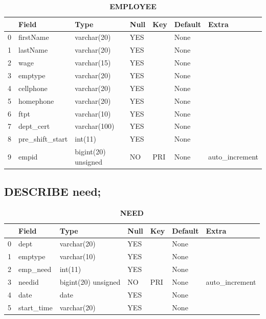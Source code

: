 \documentclass{article} %
\begin{document}
\begin{table}[H]
	\centering
	\caption{\textbf{EMPLOYEE}}
\begin{tabular}{|p{2cm}|p{2cm}|p{2cm}|p{2cm}|p{2cm}|p{2cm}|p{2cm}|}
	\hline
	\toprule
	{} &            Field &                 Type & Null &  Key & Default &           Extra \\
	\hline
	\midrule
	0 &        firstName &          varchar(20) &  YES &      &    None &                 \\
	1 &         lastName &          varchar(20) &  YES &      &    None &                 \\
	2 &             wage &          varchar(15) &  YES &      &    None &                 \\
	3 &          emptype &          varchar(20) &  YES &      &    None &                 \\
	4 &        cellphone &          varchar(20) &  YES &      &    None &                 \\
	5 &        homephone &          varchar(20) &  YES &      &    None &                 \\
	6 &             ftpt &          varchar(10) &  YES &      &    None &                 \\
	7 &        dept\_cert &         varchar(100) &  YES &      &    None &                 \\
	8 &  pre\_shift\_start &              int(11) &  YES &      &    None &                 \\
	9 &            empid &  bigint(20) unsigned &   NO &  PRI &    None &  auto\_increment \\
	\bottomrule
	\hline
\end{tabular}
\end{table}


\subsection*{DESCRIBE need;}

\begin{table}[H]
	\centering
	\caption{\textbf{NEED}}
\begin{tabular}{|p{2cm}|p{2cm}|p{2cm}|p{2cm}|p{2cm}|p{2cm}|p{2cm}|}
	\hline
	\toprule
	{} &       Field &                 Type & Null &  Key & Default &           Extra \\
	\hline
	\midrule
	0 &        dept &          varchar(20) &  YES &      &    None &                 \\
	1 &     emptype &          varchar(10) &  YES &      &    None &                 \\
	2 &    emp\_need &              int(11) &  YES &      &    None &                 \\
	3 &      needid &  bigint(20) unsigned &   NO &  PRI &    None &  auto\_increment \\
	4 &        date &                 date &  YES &      &    None &                 \\
	5 &  start\_time &          varchar(20) &  YES &      &    None &                 \\
	\bottomrule
	\hline
\end{tabular}
\end{table}
\end{document}
